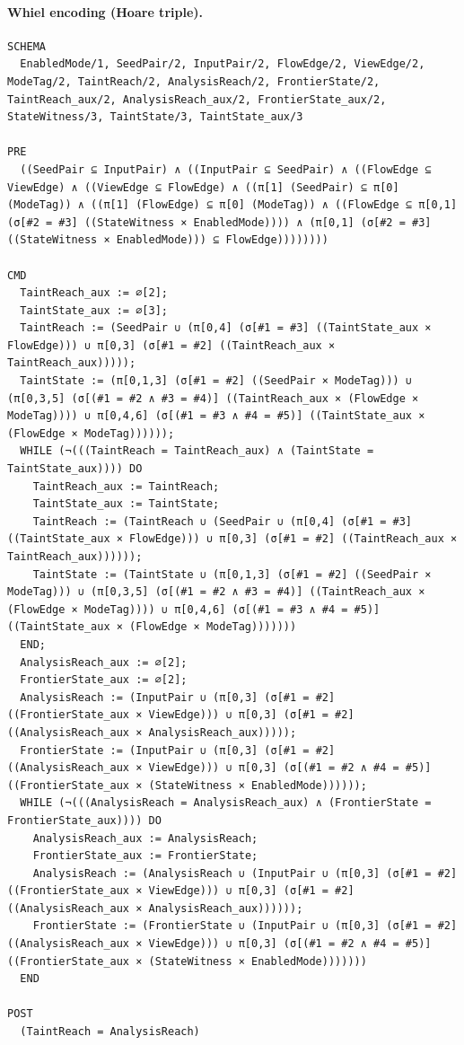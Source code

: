 \documentclass[10pt]{article}
\begin{document}
\paragraph{Whiel encoding (Hoare triple).}

\begin{Verbatim}[fontsize=\scriptsize,breaklines=true,breakanywhere=true,frame=single,framesep=1.5mm]
SCHEMA
  EnabledMode/1, SeedPair/2, InputPair/2, FlowEdge/2, ViewEdge/2, ModeTag/2, TaintReach/2, AnalysisReach/2, FrontierState/2, TaintReach_aux/2, AnalysisReach_aux/2, FrontierState_aux/2, StateWitness/3, TaintState/3, TaintState_aux/3

PRE
  ((SeedPair ⊆ InputPair) ∧ ((InputPair ⊆ SeedPair) ∧ ((FlowEdge ⊆ ViewEdge) ∧ ((ViewEdge ⊆ FlowEdge) ∧ ((π[1] (SeedPair) ⊆ π[0] (ModeTag)) ∧ ((π[1] (FlowEdge) ⊆ π[0] (ModeTag)) ∧ ((FlowEdge ⊆ π[0,1] (σ[#2 = #3] ((StateWitness × EnabledMode)))) ∧ (π[0,1] (σ[#2 = #3] ((StateWitness × EnabledMode))) ⊆ FlowEdge))))))))

CMD
  TaintReach_aux := ∅[2];
  TaintState_aux := ∅[3];
  TaintReach := (SeedPair ∪ (π[0,4] (σ[#1 = #3] ((TaintState_aux × FlowEdge))) ∪ π[0,3] (σ[#1 = #2] ((TaintReach_aux × TaintReach_aux)))));
  TaintState := (π[0,1,3] (σ[#1 = #2] ((SeedPair × ModeTag))) ∪ (π[0,3,5] (σ[(#1 = #2 ∧ #3 = #4)] ((TaintReach_aux × (FlowEdge × ModeTag)))) ∪ π[0,4,6] (σ[(#1 = #3 ∧ #4 = #5)] ((TaintState_aux × (FlowEdge × ModeTag))))));
  WHILE (¬(((TaintReach = TaintReach_aux) ∧ (TaintState = TaintState_aux)))) DO
    TaintReach_aux := TaintReach;
    TaintState_aux := TaintState;
    TaintReach := (TaintReach ∪ (SeedPair ∪ (π[0,4] (σ[#1 = #3] ((TaintState_aux × FlowEdge))) ∪ π[0,3] (σ[#1 = #2] ((TaintReach_aux × TaintReach_aux))))));
    TaintState := (TaintState ∪ (π[0,1,3] (σ[#1 = #2] ((SeedPair × ModeTag))) ∪ (π[0,3,5] (σ[(#1 = #2 ∧ #3 = #4)] ((TaintReach_aux × (FlowEdge × ModeTag)))) ∪ π[0,4,6] (σ[(#1 = #3 ∧ #4 = #5)] ((TaintState_aux × (FlowEdge × ModeTag)))))))
  END;
  AnalysisReach_aux := ∅[2];
  FrontierState_aux := ∅[2];
  AnalysisReach := (InputPair ∪ (π[0,3] (σ[#1 = #2] ((FrontierState_aux × ViewEdge))) ∪ π[0,3] (σ[#1 = #2] ((AnalysisReach_aux × AnalysisReach_aux)))));
  FrontierState := (InputPair ∪ (π[0,3] (σ[#1 = #2] ((AnalysisReach_aux × ViewEdge))) ∪ π[0,3] (σ[(#1 = #2 ∧ #4 = #5)] ((FrontierState_aux × (StateWitness × EnabledMode))))));
  WHILE (¬(((AnalysisReach = AnalysisReach_aux) ∧ (FrontierState = FrontierState_aux)))) DO
    AnalysisReach_aux := AnalysisReach;
    FrontierState_aux := FrontierState;
    AnalysisReach := (AnalysisReach ∪ (InputPair ∪ (π[0,3] (σ[#1 = #2] ((FrontierState_aux × ViewEdge))) ∪ π[0,3] (σ[#1 = #2] ((AnalysisReach_aux × AnalysisReach_aux))))));
    FrontierState := (FrontierState ∪ (InputPair ∪ (π[0,3] (σ[#1 = #2] ((AnalysisReach_aux × ViewEdge))) ∪ π[0,3] (σ[(#1 = #2 ∧ #4 = #5)] ((FrontierState_aux × (StateWitness × EnabledMode)))))))
  END

POST
  (TaintReach = AnalysisReach)
\end{Verbatim}
\end{document}
